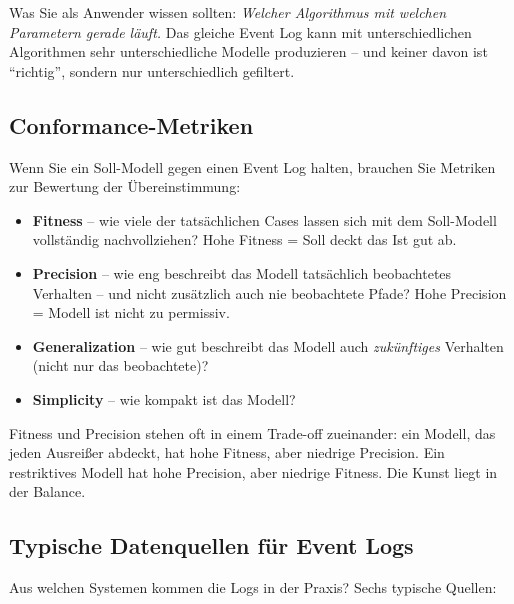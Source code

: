 \documentclass[11pt,a4paper,oneside]{article}
\newcommand{\fachbegriff}[1]{\textbf{#1}}
\begin{document}
Was Sie als Anwender wissen sollten: \emph{Welcher Algorithmus mit welchen Parametern gerade läuft.} Das gleiche Event Log kann mit unterschiedlichen Algorithmen sehr unterschiedliche Modelle produzieren -- und keiner davon ist ``richtig'', sondern nur unterschiedlich gefiltert.

\subsection{Conformance-Metriken}

Wenn Sie ein Soll-Modell gegen einen Event Log halten, brauchen Sie Metriken zur Bewertung der Übereinstimmung:

\begin{itemize}
  \item \fachbegriff{Fitness} -- wie viele der tatsächlichen Cases lassen sich mit dem Soll-Modell vollständig nachvollziehen? Hohe Fitness = Soll deckt das Ist gut ab.
  \item \fachbegriff{Precision} -- wie eng beschreibt das Modell tatsächlich beobachtetes Verhalten -- und nicht zusätzlich auch nie beobachtete Pfade? Hohe Precision = Modell ist nicht zu permissiv.
  \item \fachbegriff{Generalization} -- wie gut beschreibt das Modell auch \emph{zukünftiges} Verhalten (nicht nur das beobachtete)?
  \item \fachbegriff{Simplicity} -- wie kompakt ist das Modell?
\end{itemize}

Fitness und Precision stehen oft in einem Trade-off zueinander: ein Modell, das jeden Ausreißer abdeckt, hat hohe Fitness, aber niedrige Precision. Ein restriktives Modell hat hohe Precision, aber niedrige Fitness. Die Kunst liegt in der Balance.

\subsection{Typische Datenquellen für Event Logs}

Aus welchen Systemen kommen die Logs in der Praxis? Sechs typische Quellen:
\end{document}
